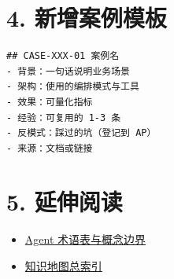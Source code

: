 \documentclass[9pt,a4paper,twocolumn]{ctexart}
\begin{document}
\section*{4. 新增案例模板}


\begin{lstlisting}
## CASE-XXX-01 案例名
- 背景：一句话说明业务场景
- 架构：使用的编排模式与工具
- 效果：可量化指标
- 经验：可复用的 1-3 条
- 反模式：踩过的坑（登记到 AP）
- 来源：文档或链接
\end{lstlisting}



\section*{5. 延伸阅读}

\begin{itemize}[itemsep=1pt, topsep=2pt]
  \item \href{../00-概念与术语/01-Agent术语表与概念边界.md}{Agent 术语表与概念边界}
  \item \href{../../../知识地图总索引.md}{知识地图总索引}
\end{itemize}
\end{document}
